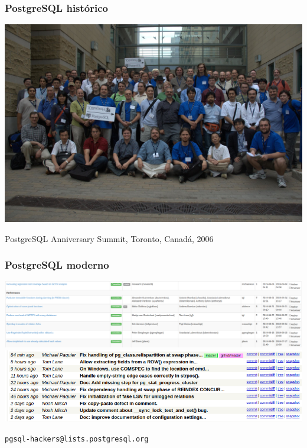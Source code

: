 

\begin{frame}
\titlepage
\end{frame}

\begin{frame}

\frametitle{PostgreSQL histórico}

 \includegraphics{anniv.jpg}

 \footnotesize
PostgreSQL Anniversary Summit, Toronto, Canadá, 2006

\end{frame}

\begin{frame}

\frametitle{PostgreSQL moderno}

\includegraphics{cfpatches.png}
\includegraphics{commits.png}

\hfill \texttt{pgsql-hackers@lists.postgresql.org}

\end{frame}


